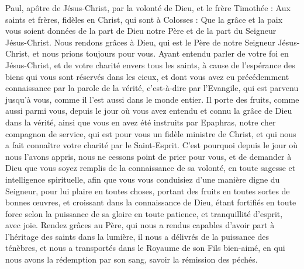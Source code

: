 \begin{multicols}{2}
\VerseOne{}Paul, apôtre de Jésus-Christ, par la volonté de Dieu, et le frère Timothée :
Aux saints et frères, fidèles en Christ, qui sont à Colosses : Que la grâce et la paix vous soient données de la part de Dieu notre Père et de la part du Seigneur Jésus-Christ.
Nous rendons grâces à Dieu, qui est le Père de notre Seigneur Jésus-Christ, et nous prions toujours pour vous.
Ayant entendu parler de votre foi en Jésus-Christ, et de votre charité envers tous les saints,
à cause de l'espérance des biens qui vous sont réservés dans les cieux, et dont vous avez eu précédemment connaissance par la parole de la vérité, c'est-à-dire par l'Evangile,
qui est parvenu jusqu'à vous, comme il l'est aussi dans le monde entier. Il porte des fruits, comme aussi parmi vous, depuis le jour où vous avez entendu et connu la grâce de Dieu dans la vérité,
ainsi que vous en avez été instruits par Epaphras, notre cher compagnon de service, qui est pour vous un fidèle ministre de Christ,
et qui nous a fait connaître votre charité par le Saint-Esprit.
C'est pourquoi depuis le jour où nous l'avons appris, nous ne cessons point de prier pour vous, et de demander à Dieu que vous soyez remplis de la connaissance de sa volonté, en toute sagesse et intelligence spirituelle,
afin que vous vous conduisiez d'une manière digne du Seigneur, pour lui plaire en toutes choses, portant des fruits en toutes sortes de bonnes œuvres, et croissant dans la connaissance de Dieu,
étant fortifiés en toute force selon la puissance de sa gloire en toute patience, et tranquillité d'esprit, avec joie.
Rendez grâces au Père, qui nous a rendus capables d'avoir part à l'héritage des saints dans la lumière,
il nous a délivrés de la puissance des ténèbres, et nous a transportés dans le Royaume de son Fils bien-aimé,
en qui nous avons la rédemption par son sang, savoir la rémission des péchés.

\end{multicols}
